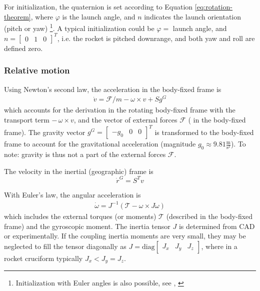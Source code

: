 For initialization, the quaternion is set according to Equation \ref{eq:rotation-theorem}, where $\varphi$ is the launch angle, and $n$ indicates the launch orientation (pitch or yaw) \footnote{Initialization with Euler angles is also possible, see \cite{stevens2015}, \cite[p. 126]{zipfel2007}}.
A typical initialization could be $\varphi = $ launch angle, and $n = [\begin{smallmatrix} 0 & 1 & 0 \end{smallmatrix}]^T$, i.e. the rocket is pitched downrange, and both yaw and roll are defined zero.

\subsubsection{Relative motion}
Using Newton's second law, the acceleration in the body-fixed frame is \cite{zipfel2007, stevens2015}
\begin{align}
    \dot v = \mathcal{F}/m - \omega \times v + S g^G
    \label{eq:model-vel-deriv}
\end{align}
which accounts for the derivation in the rotating body-fixed frame with the transport term $- \, \omega \times v$, and the vector of external forces $\mathcal{F}$ ( in the body-fixed frame).
The gravity vector $g^G = \begin{bmatrix} -g_0 & 0 & 0 \end{bmatrix}^T$ is transformed to the body-fixed frame to account for the gravitational acceleration (magnitude $g_0 \approx 9.81 \frac{\mathrm{m}}{\mathrm{s}^2}$).
To note: gravity is thus not a part of the external forces $\mathcal{F}$.

The velocity in the inertial (geographic) frame is \cite{zipfel2007}
\begin{equation}
    \dot r^G = S^T v
    \label{eq:model-pos-deriv}
\end{equation}

With Euler's law, the angular acceleration is \cite{zipfel2007, schiehlen2017}
\begin{align}
   \dot \omega = J^{-1} (\mathcal{T} - \omega \times J \omega)
   \label{eq:model-rate-deriv}
\end{align}
which includes the external torques (or moments) $\mathcal{T}$ (described in the body-fixed frame) and the gyroscopic moment.
The inertia tensor $J$ is determined from CAD or experimentally. If the coupling inertia moments are very small, they may be neglected to fill the tensor diagonally as $J = \text{diag}\begin{bmatrix} J_x & J_y & J_z \end{bmatrix}$, where in a rocket cruciform typically $ J_x < J_y = J_z$.

